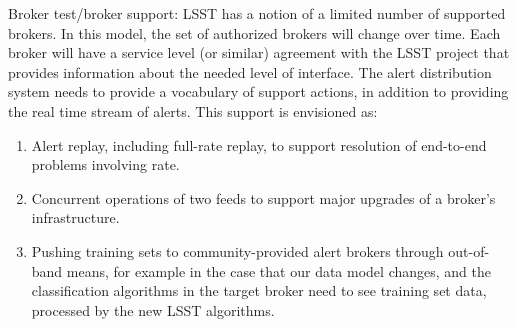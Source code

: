 Broker test/broker support: LSST has a notion of a limited number of supported brokers. In this model, the set of authorized brokers will change over time. Each broker will have a service level (or similar) agreement with the LSST project that provides information about the needed level of interface. The alert distribution system needs to provide a vocabulary of support actions, in addition to providing the real time stream of alerts. This support is envisioned as:

\begin{enumerate}

\item Alert replay, including full-rate replay, to support resolution of end-to-end problems involving rate.

\item Concurrent operations of two feeds to support major upgrades of a broker’s infrastructure.

\item Pushing training sets to community-provided alert brokers through out-of-band means, for example in the case that our data model changes, and the classification algorithms in the target broker need to see training set data, processed by the new LSST algorithms. 

\end{enumerate}
